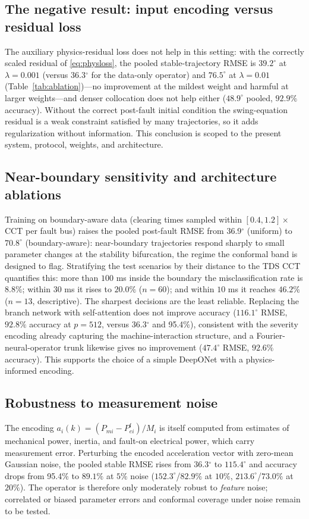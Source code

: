 \documentclass[5p,times]{elsarticle}
\newcommand{\rmsePost}{36.9}          %
\newcommand{\rmseAll}{36.3}           %
\newcommand{\pctACC}{95.4\%}          %
\begin{document}
\subsection{The negative result: input encoding versus residual loss}
The auxiliary physics-residual loss does not help in this setting: with the correctly scaled
residual of \eqref{eq:physloss}, the pooled stable-trajectory RMSE is $39.2^\circ$ at
$\lambda{=}0.001$ (versus \rmseAll{}$^\circ$ for the data-only operator) and $76.5^\circ$ at
$\lambda{=}0.01$ (Table~\ref{tab:ablation})---no improvement at the mildest weight and harmful at
larger weights---and denser collocation does not help either ($48.9^\circ$ pooled, $92.9\%$
accuracy). Without the correct post-fault initial condition the swing-equation residual is a weak
constraint satisfied by many trajectories, so it adds regularization without information. This conclusion is scoped to the present system, protocol, weights, and architecture.

\subsection{Near-boundary sensitivity and architecture ablations}
Training on boundary-aware data (clearing times sampled within $[0.4,1.2]\times$CCT per fault
bus) raises the pooled post-fault RMSE from \rmsePost{}$^\circ$ (uniform) to $70.8^\circ$
(boundary-aware): near-boundary trajectories respond sharply to small parameter changes at the
stability bifurcation, the regime the conformal band is designed to flag. Stratifying the test scenarios by their distance to the TDS CCT quantifies this:
more than $100$ ms inside the boundary the misclassification rate is $8.8\%$; within $30$ ms it
rises to $20.0\%$ ($n{=}60$); and within $10$ ms it reaches $46.2\%$ ($n{=}13$, descriptive). The
sharpest decisions are the least reliable. Replacing the branch network with self-attention does
not improve accuracy ($116.1^\circ$ RMSE, $92.8\%$ accuracy at $p{=}512$, versus
\rmseAll{}$^\circ$ and \pctACC{}), consistent with the severity encoding already capturing the
machine-interaction structure, and a Fourier-neural-operator trunk likewise gives no improvement
($47.4^\circ$ RMSE, $92.6\%$ accuracy). This supports the choice of a
simple DeepONet with a physics-informed encoding.

\subsection{Robustness to measurement noise}
The encoding $a_i(k)=(P_{mi}-P_{ei}^{\mathrm{f}})/M_i$ is itself computed from estimates of
mechanical power, inertia, and fault-on electrical power, which carry measurement error.
Perturbing the encoded acceleration vector with zero-mean Gaussian noise, the pooled stable RMSE
rises from \rmseAll{}$^\circ$ to $115.4^\circ$ and accuracy drops from \pctACC{} to $89.1\%$ at
$5\%$ noise ($152.3^\circ$/$82.9\%$ at $10\%$, $213.6^\circ$/$73.0\%$ at $20\%$). The operator is therefore only moderately robust to
\emph{feature} noise; correlated or biased parameter errors and conformal coverage under noise
remain to be tested.
\end{document}
